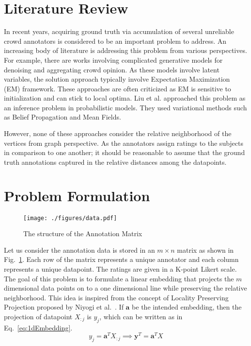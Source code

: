\documentclass{article} \usepackage{nips14submit_e,times}
\begin{document}
\section{Literature Review}
In recent years, acquiring ground truth via accumulation of several unreliable crowd annotators is considered to be an important problem to address. An increasing body of literature is addressing this problem from various perspectives. For example, there are works involving complicated generative models \cite{Whitehill2009}\cite{Raykar2010} for denoising and aggregating crowd opinion. As these models involve latent variables, the solution approach typically involve Expectation Maximization (EM) \cite{Dempster1977} framework. These approaches are often criticized\cite{Karger2011} as EM is sensitive to initialization and can stick to local optima. Liu et al. \cite{Liu2012} approached this problem as an inference problem in probabilistic models. They used variational methods such as Belief Propagation and Mean Fields. 

However, none of these approaches consider the relative neighborhood of the vertices from graph perspective. As the annotators assign ratings to the subjects in comparison to one another; it should be reasonable to assume that the ground truth annotations captured in the relative distances among the datapoints.

\section{Problem Formulation}\label{sec:probfor}
\begin{figure}
\centering
\texttt{[image: ./figures/data.pdf]}
\caption{The structure of the Annotation Matrix}
\label{Fig:dataStruct}
\end{figure}
Let us consider the annotation data is stored in an $m\times n$ matrix as shown in Fig.~\ref{Fig:dataStruct}. Each row of the matrix represents a unique annotator and each column represents a unique datapoint. The ratings are given in a K-point Likert scale. The goal of this problem is to formulate a linear embedding that projects the $m$ dimensional data points on to a one dimensional line while preserving the relative neighborhood. This idea is inspired from the concept of Locality Preserving Projection proposed by Niyogi et al.~\cite{Niyogi2004}. If $\mathbf{a}$ be the intended embedding, then the projection of datapoint $X_{:j}$ is $y_j$, which can be written as in Eq.~\eqref{eq:1dEmbedding}. 
\begin{equation}
y_j = \mathbf{a}^T X_{:j} \implies \mathbf{y}^T = \mathbf{a}^T X
\label{eq:1dEmbedding}
\end{equation}
\end{document}
